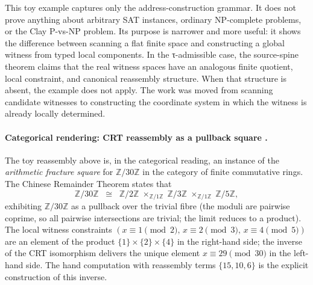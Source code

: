 \documentclass{pantarhei-researchnote}
\begin{document}
This toy example captures only the address-construction grammar. It does
not prove anything about arbitrary SAT instances, ordinary NP-complete
problems, or the Clay P-vs-NP problem. Its purpose is narrower and more
useful: it shows the difference between scanning a flat finite space and
constructing a global witness from typed local components. In the
τ-admissible case, the source-spine theorem claims that the real witness
spaces have an analogous finite quotient, local constraint, and canonical
reassembly structure. When that structure is absent, the example does not
apply.
The work was moved from scanning candidate witnesses to constructing the
coordinate system in which the witness is already locally determined.

\paragraph{Categorical rendering: CRT reassembly as a pullback square \scopetau.}
The toy reassembly above is, in the categorical reading, an instance of
the \emph{arithmetic fracture square} for $\mathbb{Z}/30\mathbb{Z}$ in
the category of finite commutative rings. The Chinese Remainder Theorem
states that
\[
  \mathbb{Z}/30\mathbb{Z}
  \;\;\cong\;\;
  \mathbb{Z}/2\mathbb{Z}\;\times_{\mathbb{Z}/1\mathbb{Z}}\;
  \mathbb{Z}/3\mathbb{Z}\;\times_{\mathbb{Z}/1\mathbb{Z}}\;
  \mathbb{Z}/5\mathbb{Z},
\]
exhibiting $\mathbb{Z}/30\mathbb{Z}$ as a pullback over the trivial
fibre (the moduli are pairwise coprime, so all pairwise intersections
are trivial; the limit reduces to a product). The local witness
constraints
$(x \equiv 1 \pmod 2,\, x \equiv 2 \pmod 3,\, x \equiv 4 \pmod 5)$
are an element of the product
$\{1\}\times\{2\}\times\{4\}$ in the right-hand side; the inverse of the
CRT isomorphism delivers the unique element $x \equiv 29 \pmod{30}$ in
the left-hand side. The hand computation with reassembly terms
$\{15, 10, 6\}$ is the explicit construction of this inverse.
\end{document}
